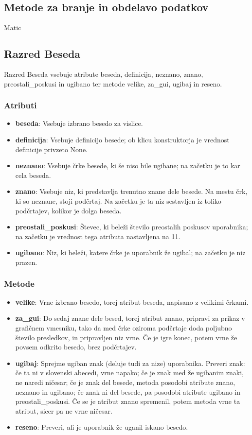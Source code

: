 \documentclass [a4paper, 12pt] {article}
\begin{document}
\subsection {Metode za branje in obdelavo podatkov}
Matic

\subsection {Razred Beseda}
Razred Beseda vsebuje atribute beseda, definicija, neznano, znano, preostali\_poskusi in ugibano ter metode velike, za\_gui, ugibaj in reseno.
\subsubsection {Atributi}
\begin {itemize}
\item \textbf {beseda}: Vsebuje izbrano besedo za vislice.
\item \textbf {definicija}: Vsebuje definicijo besede; ob klicu konstruktorja je vrednost definicije privzeto None.
\item \textbf {neznano}: Vsebuje črke besede, ki še niso bile ugibane; na začetku je to kar cela beseda. 
\item \textbf {znano}: Vsebuje niz, ki predstavlja trenutno znane dele besede. Na mestu črk, ki so neznane, stoji podčrtaj. Na začetku je ta niz sestavljen iz toliko podčrtajev, kolikor je dolga beseda.
\item \textbf {preostali\_poskusi}: Števec, ki beleži število preostalih poskusov uporabnika; na začetku je vrednost tega atributa nastavljena na 11. 
\item \textbf {ugibano}: Niz, ki beleži, katere črke je uporabnik že ugibal; na začetku je niz prazen.
\end {itemize}
\subsubsection {Metode}
\begin {itemize}
\item \textbf {velike}: Vrne izbrano besedo, torej atribut beseda, napisano z velikimi črkami.
\item \textbf {za\_gui}: Do sedaj znane dele besed, torej atribut znano, pripravi za prikaz v grafičnem vmesniku, tako da med črke oziroma podčrtaje doda poljubno število presledkov, in pripravljen niz vrne. Če je igre konec, potem vrne že povsem odkrito besedo, brez podčrtajev. 
\item \textbf{ugibaj}: Sprejme ugiban znak (deluje tudi za nize) uporabnika. Preveri znak: če ta ni v slovenski abecedi, vrne napako; če je znak med že ugibanim znaki, ne naredi ničesar; če je znak del besede, metoda posodobi atribute znano, neznano in ugibano; če znak ni del besede, pa posodobi atribute ugibano in preostali\_poskusi. Če se je atribut znano spremenil, potem metoda vrne ta atribut, sicer pa ne vrne ničesar. 
\item \textbf{reseno}: Preveri, ali je uporabnik že uganil iskano besedo.
\end {itemize}
\end{document}
